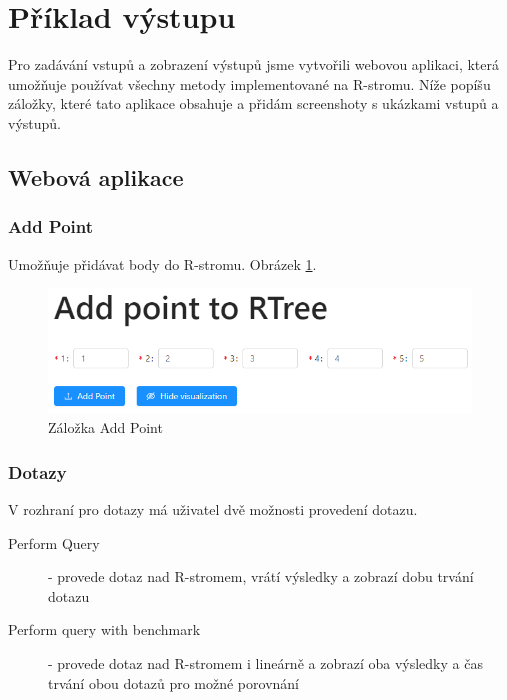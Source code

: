 \documentclass[a4paper,10pt]{article}
\begin{document}
\section{Příklad výstupu}
Pro zadávání vstupů a zobrazení výstupů jsme vytvořili webovou aplikaci, která umožňuje používat všechny metody implementované na R-stromu. Níže popíšu záložky, které tato aplikace obsahuje a přidám screenshoty s ukázkami vstupů a výstupů.

\subsection{Webová aplikace}
\subsubsection*{Add Point}
Umožňuje přidávat body do R-stromu. Obrázek \ref{fig:addpoint}.
\begin{figure}
    \includegraphics[width=\textwidth]{AddPoint.png}
    \caption{Záložka Add Point}
    \label{fig:addpoint}
\end{figure}
\subsubsection*{Dotazy}
V rozhraní pro dotazy má uživatel dvě možnosti provedení dotazu. 

\begin{description}
	\item[Perform Query] - provede dotaz nad R-stromem, vrátí výsledky a zobrazí dobu trvání dotazu
    \item[Perform query with benchmark] - provede dotaz nad R-stromem i lineárně a zobrazí oba výsledky a čas trvání obou dotazů pro možné porovnání
\end{description}
\end{document}
